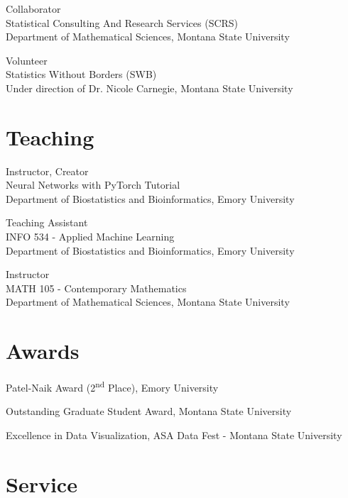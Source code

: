 \documentclass{wm_cv}
\begin{document}
Collaborator \hfill {} \\ 
    \indent \quad Statistical Consulting And Research Services (SCRS) \\
   \indent \quad Department of Mathematical Sciences, Montana State University

Volunteer \hfill {} \\ 
    \indent \quad Statistics Without Borders (SWB) \\
   \indent \quad Under direction of Dr. Nicole Carnegie, Montana State University


\section{Teaching}

Instructor, Creator \hfill {} \\ 
    \indent \quad Neural Networks with PyTorch Tutorial \\
   \indent \quad Department of Biostatistics and Bioinformatics, Emory University

Teaching Assistant \hfill {} \\ 
    \indent \quad INFO 534 - Applied Machine Learning  \\
   \indent \quad Department of Biostatistics and Bioinformatics, Emory University

Instructor \hfill {} \\ 
    \indent \quad MATH 105 - Contemporary Mathematics  \\
   \indent \quad Department of Mathematical Sciences, Montana State University


\section{Awards}

Patel-Naik Award (2\textsuperscript{nd} Place), Emory University \hfill {}

Outstanding Graduate Student Award, Montana State University \hfill {}  

Excellence in Data Visualization, ASA Data Fest - Montana State University \hfill  {}



\section{Service}
\end{document}
